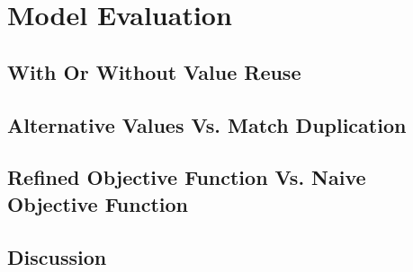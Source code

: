 %

\chapter{Model Evaluation}

\section{With Or Without Value Reuse}
\section{Alternative Values Vs. Match Duplication}
\section{Refined Objective Function Vs. Naive Objective Function}
\section{Discussion}
